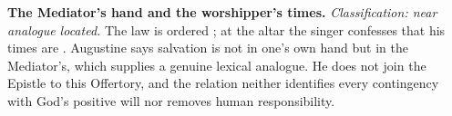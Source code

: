 \noindent\textbf{The Mediator's hand and the worshipper's times.\enspace{}}
\emph{Classification: near analogue located.} The law is ordered
; at the altar the singer confesses that his times
are . Augustine says salvation is not in one's own hand
but in the Mediator's, which supplies a genuine lexical analogue. He does not
join the Epistle to this Offertory, and the relation neither identifies every
contingency with God's positive will nor removes human responsibility.
